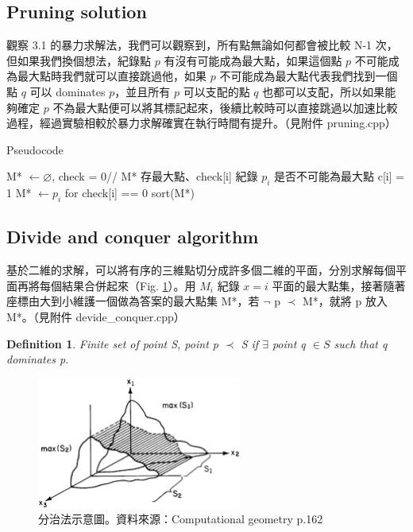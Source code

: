 \documentclass[12pt]{article}
\newtheorem{definition}{Definition}
\begin{document}
\subsection{Pruning solution}
觀察 3.1 的暴力求解法，我們可以觀察到，所有點無論如何都會被比較 N-1 次，但如果我們換個想法，紀錄點 $p$ 有沒有可能成為最大點，如果這個點 $p$ 不可能成為最大點時我們就可以直接跳過他，如果 $p$ 不可能成為最大點代表我們找到一個點 $q$ 可以 dominates $p$，並且所有 $p$ 可以支配的點 $q$ 也都可以支配，所以如果能夠確定 $p$ 不為最大點便可以將其標記起來，後續比較時可以直接跳過以加速比較過程，經過實驗相較於暴力求解確實在執行時間有提升。（見附件  pruning.cpp）

\begin{algorithm}[H]
	\caption{Pseudocode}
	\begin{algorithmic}
		\State M* $\leftarrow \varnothing$, check = {0}// M* 存最大點、check[i] 紀錄 $p_i$ 是否不可能為最大點
				\State c[i] = 1
				\EndIf
			\EndFor
		\EndFor
		\State M* $\leftarrow p_i$ for check[i] == 0
		\State sort(M*)
	\end{algorithmic}
\end{algorithm}

\subsection{Divide and conquer algorithm}
基於二維的求解，可以將有序的三維點切分成許多個二維的平面，分別求解每個平面再將每個結果合併起來（Fig. \ref{3DMaximal}）。用 $M_i$ 紀錄 $x=i$ 平面的最大點集，接著隨著座標由大到小維護一個做為答案的最大點集 M*，若 $\neg$ p $\prec$ M*，就將 p 放入 M*。（見附件 devide\_conquer.cpp）


\begin{definition}
	Finite set of point S, point p $\prec$ S if $\exists$ point q $\in S$ such that q dominates p.
\end{definition}


\begin{figure}[H]
	\centering
	\includegraphics[width=0.6\textwidth]{3DMaximal}
	\caption{分治法示意圖\cite{Computational_geometry}。資料來源：Computational geometry p.162} %
	\label{3DMaximal} 
\end{figure}
\end{document}

